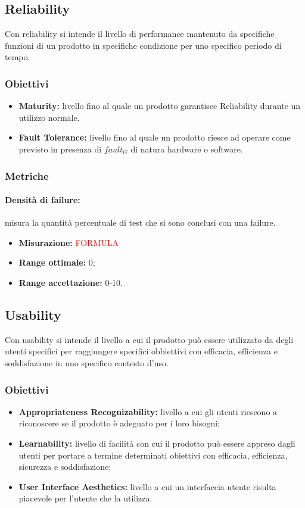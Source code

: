 	\subsection{Reliability}
		Con reliability si intende il livello di performance mantenuto da specifiche funzioni di un prodotto in specifiche condizione per uno specifico periodo di tempo.
		\subsubsection{Obiettivi}
		\begin{itemize}
			\item {\textbf{Maturity:} livello fino al quale un prodotto garantisce Reliability durante un utilizzo normale.}
			\item {\textbf{Fault Tolerance:} livello fino al quale un prodotto riesce ad operare come previsto in presenza di $fault_G$ di natura hardware o software.}
		\end{itemize}
		\subsubsection{Metriche}
			\paragraph{Densità di failure:} misura la quantità percentuale di test che si sono conclusi con una failure.
			\begin{itemize}
				\item {\textbf{Misurazione:} \textcolor{red}{FORMULA}}
				\item {\textbf{Range ottimale:} 0;}
				\item {\textbf{Range accettazione:} 0-10.}
			\end{itemize} 
			
	\subsection{Usability}
		Con usability si intende il livello a cui il prodotto può essere utilizzato da degli utenti specifici per raggiungere specifici obbiettivi con efficacia, efficienza e soddisfazione in uno specifico contesto d'uso.  
		\subsubsection{Obiettivi}
		\begin{itemize}
			\item {\textbf{Appropriateness Recognizability:} livello a cui gli utenti riescono a riconoscere se il prodotto è adeguato per i loro bisogni;}
			\item {\textbf{Learnability:} livello di facilità con cui il prodotto può essere appreso dagli utenti per portare a termine determinati obiettivi con efficacia, efficienza, sicurezza e soddisfazione;} 
			\item {\textbf{User Interface Aesthetics:} livello a cui un interfaccia utente risulta piacevole per l'utente che la utilizza. }
			
		\end{itemize}
